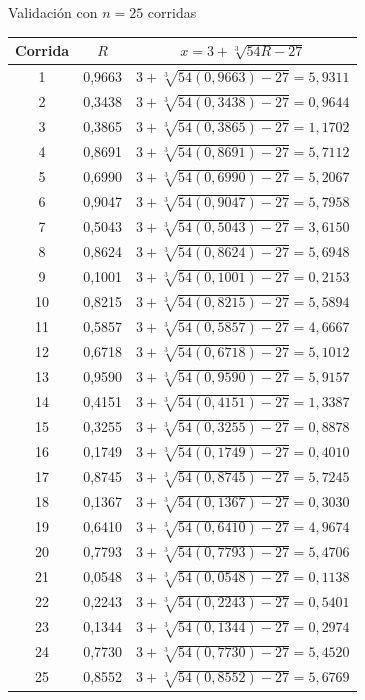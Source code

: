 \begin{mitabla}[H]{\texorpdfstring{Validación con $n=25$ corridas}{Validacion con n=25 corridas}}
\begin{tabular}{ccc}
\toprule
Corrida & $R$ & $x=3+\sqrt[3]{54R-27}$ \\
\midrule
1 & 0,9663 & $3+\sqrt[3]{54(0,9663)-27} = 5,9311$ \\
2 & 0,3438 & $3+\sqrt[3]{54(0,3438)-27} = 0,9644$ \\
3 & 0,3865 & $3+\sqrt[3]{54(0,3865)-27} = 1,1702$ \\
4 & 0,8691 & $3+\sqrt[3]{54(0,8691)-27} = 5,7112$ \\
5 & 0,6990 & $3+\sqrt[3]{54(0,6990)-27} = 5,2067$ \\
6 & 0,9047 & $3+\sqrt[3]{54(0,9047)-27} = 5,7958$ \\
7 & 0,5043 & $3+\sqrt[3]{54(0,5043)-27} = 3,6150$ \\
8 & 0,8624 & $3+\sqrt[3]{54(0,8624)-27} = 5,6948$ \\
9 & 0,1001 & $3+\sqrt[3]{54(0,1001)-27} = 0,2153$ \\
10 & 0,8215 & $3+\sqrt[3]{54(0,8215)-27} = 5,5894$ \\
11 & 0,5857 & $3+\sqrt[3]{54(0,5857)-27} = 4,6667$ \\
12 & 0,6718 & $3+\sqrt[3]{54(0,6718)-27} = 5,1012$ \\
13 & 0,9590 & $3+\sqrt[3]{54(0,9590)-27} = 5,9157$ \\
14 & 0,4151 & $3+\sqrt[3]{54(0,4151)-27} = 1,3387$ \\
15 & 0,3255 & $3+\sqrt[3]{54(0,3255)-27} = 0,8878$ \\
16 & 0,1749 & $3+\sqrt[3]{54(0,1749)-27} = 0,4010$ \\
17 & 0,8745 & $3+\sqrt[3]{54(0,8745)-27} = 5,7245$ \\
18 & 0,1367 & $3+\sqrt[3]{54(0,1367)-27} = 0,3030$ \\
19 & 0,6410 & $3+\sqrt[3]{54(0,6410)-27} = 4,9674$ \\
20 & 0,7793 & $3+\sqrt[3]{54(0,7793)-27} = 5,4706$ \\
21 & 0,0548 & $3+\sqrt[3]{54(0,0548)-27} = 0,1138$ \\
22 & 0,2243 & $3+\sqrt[3]{54(0,2243)-27} = 0,5401$ \\
23 & 0,1344 & $3+\sqrt[3]{54(0,1344)-27} = 0,2974$ \\
24 & 0,7730 & $3+\sqrt[3]{54(0,7730)-27} = 5,4520$ \\
25 & 0,8552 & $3+\sqrt[3]{54(0,8552)-27} = 5,6769$ \\
\bottomrule
\end{tabular}
\end{mitabla}

